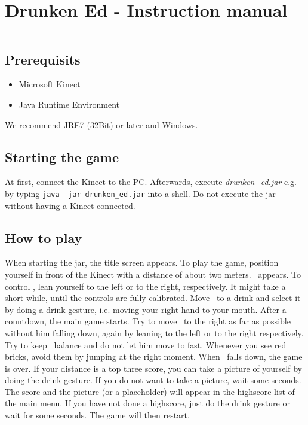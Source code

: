 \documentclass{article}
\begin{document}
\section*{Drunken Ed - Instruction manual}

$ $\\

\subsection*{Prerequisits}

\begin{itemize}
\item Microsoft Kinect
\item Java Runtime Environment
\end{itemize}
We recommend JRE7 (32Bit) or later and Windows.

\subsection*{Starting the game}

At first, connect the Kinect to the PC. Afterwards, execute \textit{drunken\_ed.jar} e.g. by typing \texttt{java -jar drunken\_ed.jar} into a shell. Do not execute the jar without having a Kinect connected.

\subsection*{How to play}

When starting the jar, the title screen appears.
To play the game, position yourself in front of the Kinect with a distance of about two meters. \ed\ appears. To control \ed, lean yourself to the left or to the right, respectively.
It might take a short while, until the controls are fully calibrated. Move \ed\ to a drink and select it by doing a drink gesture, i.e. moving your right hand to your mouth. After a countdown, the main game starts. Try to move \ed\ to the right as far as possible without him falling down, again by leaning to the left or to the right respectively. Try to keep \eds\ balance and do not let him move to fast.
Whenever you see red bricks, avoid them by jumping at the right moment.
When \ed\ falls down, the game is over. If your distance is a top three score, you can take a picture of yourself by doing the drink gesture.
If you do not want to take a picture, wait some seconds. The score and the picture (or a placeholder) will appear in the highscore list of the main menu. If you have not done a highscore, just do the drink gesture or wait for some seconds. The game will then restart.
\end{document}
